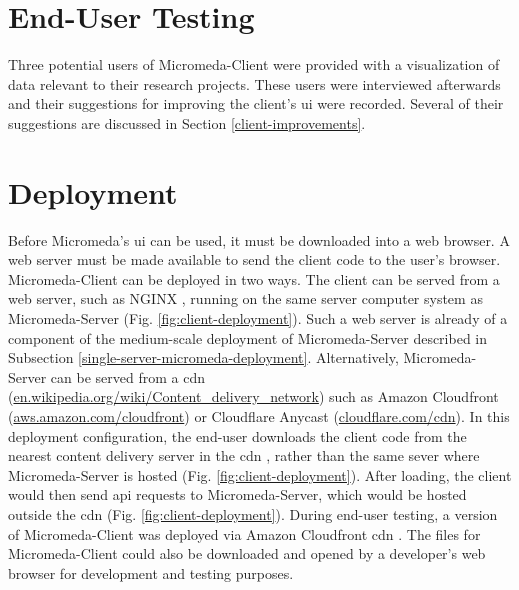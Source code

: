\section{End-User Testing}

Three potential users of Micromeda-Client were provided with a visualization of 
data relevant to their research projects. These users were interviewed 
afterwards and their suggestions for improving the client's \gls{ui} were 
recorded. Several of their suggestions are discussed in Section 
\ref{client-improvements}. 

\section{Deployment}

Before Micromeda's \gls{ui} can be used, it must be downloaded into a web 
browser. A web server must be made available to send the client code to the 
user's browser. Micromeda-Client can be deployed in two ways. The client can be 
served from a web server, such as NGINX \cite{reese2008nginx}, running on the 
same server computer system as Micromeda-Server (Fig. 
\ref{fig:client-deployment}). Such a web server is already of a component of the 
medium-scale deployment of Micromeda-Server described in Subsection 
\ref{single-server-micromeda-deployment}. Alternatively, Micromeda-Server can be 
served from a \gls{cdn} \cite{farber2003internet} 
(\href{http://en.wikipedia.org/wiki/Content_delivery_network}{en.wikipedia.org/wiki/Content\_delivery\_network}) 
such as Amazon Cloudfront \cite{varia2014overview} 
(\href{http://aws.amazon.com/cloudfront}{aws.amazon.com/cloudfront}) or 
Cloudflare Anycast \cite{calder2015analyzing} 
(\href{http://cloudflare.com/cdn}{cloudflare.com/cdn}). In this deployment 
configuration, the end-user downloads the client code from the nearest content 
delivery server in the \gls{cdn} , rather than the same sever where 
Micromeda-Server is hosted (Fig. \ref{fig:client-deployment}). After loading, 
the client would then send \gls{api} requests to Micromeda-Server, which would 
be hosted outside the \gls{cdn}  (Fig. \ref{fig:client-deployment}). During 
end-user testing, a version of Micromeda-Client was deployed via Amazon 
Cloudfront \gls{cdn} . The files for Micromeda-Client could also be downloaded 
and opened by a developer's web browser for development and testing purposes.

